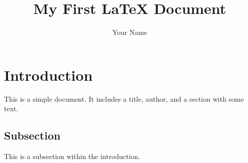 \documentclass{article}
\title{My First LaTeX Document}
\author{Your Name}
\begin{document}
\maketitle

\section{Introduction}
This is a simple document. It includes a title, author, and a section with some text.

\subsection{Subsection}
This is a subsection within the introduction.
\end{document}
